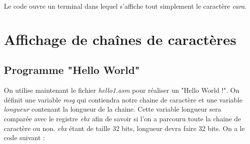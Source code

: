 \noindent Le code ouvre un terminal dans lequel s'affiche tout simplement le caractère \textit{cara}.

\section{Affichage de chaînes de caractères}
\subsection{Programme "Hello World"}
\noindent On utilise maintenant le fichier \textit{hello1.asm} pour réaliser un "Hello World !".
On définit une variable \textit{msg} qui contiendra notre chaine de caractère et une variable \textit{longueur} contenant la longueur de la chaine. Cette variable longueur sera comparée avec le registre \textit{ebx} afin de savoir si l'on a parcouru toute la chaine de caractère ou non. \textit{ebx} étant de taille 32 bits, longueur devra faire 32 bits.
On a le code suivant :
\assembly
